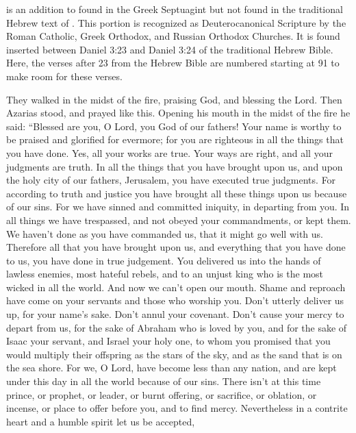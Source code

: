 {{{} is an addition to
{} found in the Greek Septuagint but not found in the traditional Hebrew text of
{}. This portion is recognized as Deuterocanonical Scripture by the Roman Catholic, Greek Orthodox, and Russian Orthodox Churches. It is found inserted between Daniel 3:23 and Daniel 3:24 of the traditional Hebrew Bible. Here, the verses after 23 from the Hebrew Bible are numbered starting at 91 to make room for these verses.}
\par }{\PP {}They walked in the midst of the fire, praising God, and blessing the Lord.
Then Azarias stood, and prayed like this. Opening his mouth in the midst of the fire he said:
“Blessed are you, O Lord, you God of our fathers! Your name is worthy to be praised and glorified for evermore;
for you are righteous in all the things that you have done. Yes, all your works are true. Your ways are right, and all your judgments are truth.
In all the things that you have brought upon us, and upon the holy city of our fathers, Jerusalem, you have executed true judgments. For according to truth and justice you have brought all these things upon us because of our sins.
For we have sinned and committed iniquity, in departing from you.
In all things we have trespassed, and not obeyed your commandments, or kept them. We haven’t done as you have commanded us, that it might go well with us.
Therefore all that you have brought upon us, and everything that you have done to us, you have done in true judgement.
You delivered us into the hands of lawless enemies, most hateful rebels, and to an unjust king who is the most wicked in all the world.
And now we can’t open our mouth. Shame and reproach have come on your servants and those who worship you.
Don’t utterly deliver us up, for your name’s sake. Don’t annul your covenant.
Don’t cause your mercy to depart from us, for the sake of Abraham who is loved by you, and for the sake of Isaac your servant, and Israel your holy one,
to whom you promised that you would multiply their offspring as the stars of the sky, and as the sand that is on the sea shore.
For we, O Lord, have become less than any nation, and are kept under this day in all the world because of our sins.
There isn’t at this time prince, or prophet, or leader, or burnt offering, or sacrifice, or oblation, or incense, or place to offer before you, and to find mercy.
Nevertheless in a contrite heart and a humble spirit let us be accepted,
}
